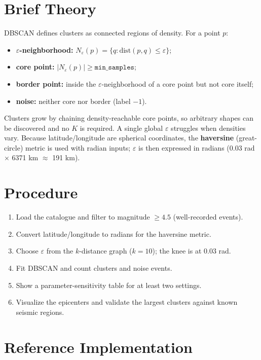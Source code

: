 \section{Brief Theory}
DBSCAN defines clusters as connected regions of density. For a point $p$:
\begin{itemize}
  \item \textbf{$\varepsilon$-neighborhood:} $N_\varepsilon(p) = \{q : \mathrm{dist}(p,q) \le \varepsilon\}$;
  \item \textbf{core point:} $|N_\varepsilon(p)| \ge \texttt{min\_samples}$;
  \item \textbf{border point:} inside the $\varepsilon$-neighborhood of a core point but not core itself;
  \item \textbf{noise:} neither core nor border (label $-1$).
\end{itemize}
Clusters grow by chaining density-reachable core points, so arbitrary shapes can be
discovered and no $K$ is required. A single global $\varepsilon$ struggles when densities
vary. Because latitude/longitude are spherical coordinates, the \textbf{haversine}
(great-circle) metric is used with radian inputs; $\varepsilon$ is then expressed in radians
($0.03$ rad $\times$ 6371 km $\approx$ 191 km).

\section{Procedure}
\begin{enumerate}
  \item Load the catalogue and filter to magnitude $\ge 4.5$ (well-recorded events).
  \item Convert latitude/longitude to radians for the haversine metric.
  \item Choose $\varepsilon$ from the $k$-distance graph ($k = 10$); the knee is at 0.03 rad.
  \item Fit DBSCAN and count clusters and noise events.
  \item Show a parameter-sensitivity table for at least two settings.
  \item Visualize the epicenters and validate the largest clusters against known seismic regions.
\end{enumerate}

\section{Reference Implementation}


